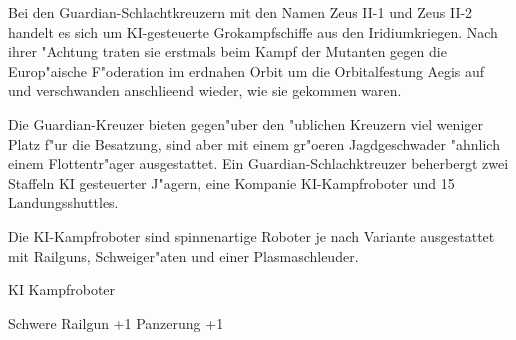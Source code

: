 
Bei den Guardian-Schlachtkreuzern mit den Namen Zeus II-1 und Zeus II-2 handelt es sich um KI-gesteuerte Gro\3kampfschiffe aus den Iridiumkriegen. Nach ihrer "Achtung traten sie erstmals beim Kampf der Mutanten gegen die Europ"aische F"oderation im erdnahen Orbit um die Orbitalfestung Aegis auf und verschwanden anschlie\3end wieder, wie sie gekommen waren.

Die Guardian-Kreuzer bieten gegen"uber den "ublichen Kreuzern viel weniger Platz f"ur die Besatzung, sind aber mit einem gr"o\3eren Jagdgeschwader "ahnlich einem Flottentr"ager ausgestattet. Ein Guardian-Schlachktreuzer beherbergt zwei Staffeln KI gesteuerter J"agern, eine Kompanie KI-Kampfroboter und 15 Landungsshuttles.

Die KI-Kampfroboter sind spinnenartige Roboter je nach Variante ausgestattet mit Railguns, Schwei\3ger"aten und einer Plasmaschleuder.

\begin{nscsheet}[f]{KI Kampfroboter}
    \nscstats[ATT=3,AGG=3,CON=2]
    \nscruler
    \begin{nscinventory}
        \nscitem[Waffen] Schwere Railgun +1
        \nscitem[R"ustung] Panzerung +1
    \end{nscinventory}
\end{nscsheet}

